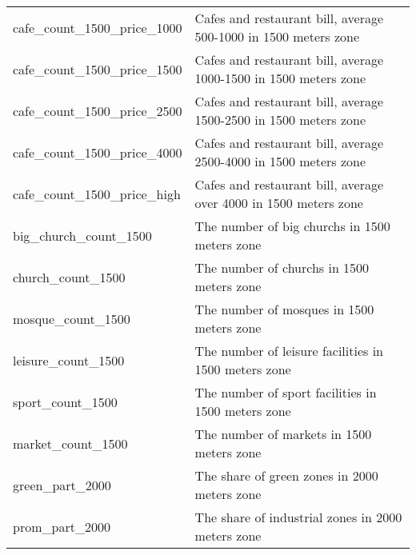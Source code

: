 \begin{longtable}[c]{ll}
    cafe\_count\_1500\_price\_1000             & Cafes and restaurant bill, average  500-1000 in 1500 meters zone                                                          \\
    cafe\_count\_1500\_price\_1500             & Cafes and restaurant bill, average  1000-1500 in 1500 meters zone                                                         \\
    cafe\_count\_1500\_price\_2500             & Cafes and restaurant bill, average  1500-2500 in 1500 meters zone                                                         \\
    cafe\_count\_1500\_price\_4000             & Cafes and restaurant bill, average  2500-4000 in 1500 meters zone                                                         \\
    cafe\_count\_1500\_price\_high             & Cafes and restaurant bill, average  over 4000 in 1500 meters zone                                                         \\
    big\_church\_count\_1500                   & The number of big churchs in 1500 meters zone                                                                             \\
    church\_count\_1500                        & The number of churchs in 1500 meters zone                                                                                 \\
    mosque\_count\_1500                        & The number of mosques in 1500 meters zone                                                                                 \\
    leisure\_count\_1500                       & The number of leisure facilities in 1500 meters zone                                                                      \\
    sport\_count\_1500                         & The number of sport facilities in 1500 meters zone                                                                        \\
    market\_count\_1500                        & The number of markets in 1500 meters zone                                                                                 \\
    green\_part\_2000                          & The share of green zones in 2000 meters zone                                                                              \\
    prom\_part\_2000                           & The share of industrial zones in 2000 meters zone                                                                         \\

\end{longtable}
